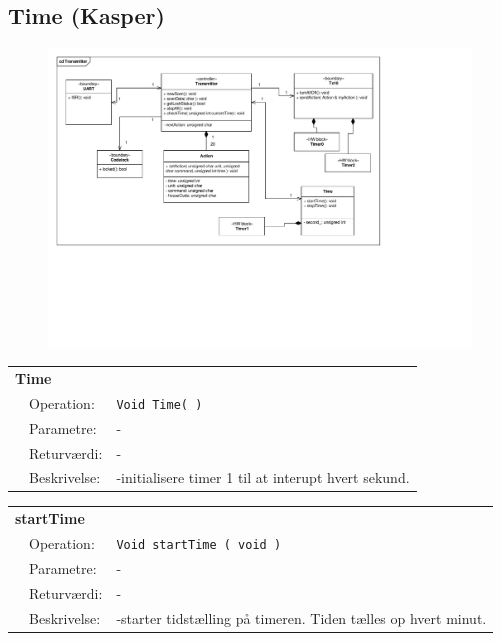 \subsection{Time (Kasper)}

\begin{figure}[h]
\centering
\includegraphics[scale=1,clip=true, trim=503 213 230 275]{Systemarkitektur/diagrammer/Transmitter_KlasseDiagram} %
\end{figure}

\begin{table}[h]
\begin{tabularx}{\textwidth}{p{0.6 cm} l X} %
\multicolumn{3}{l}{\textbf{Time}}\\
& Operation: & %
\texttt{Void Time( )}
\\ & Parametre: & %
-
\\ & Returværdi: & %
- 
\\ & Beskrivelse: & %
-initialisere timer 1 til at interupt hvert sekund.
\\ \end{tabularx}
\end{table}

\clearpage

\begin{table}[h]
\begin{tabularx}{\textwidth}{p{0.6 cm} l X} %
\multicolumn{3}{l}{\textbf{startTime}}\\
& Operation: & %
\texttt{Void startTime ( void )}
\\ & Parametre: & %
-
\\ & Returværdi: & %
- 
\\ & Beskrivelse: & %
-starter tidstælling på timeren. Tiden tælles op hvert minut.
\\ \end{tabularx}
\end{table}

